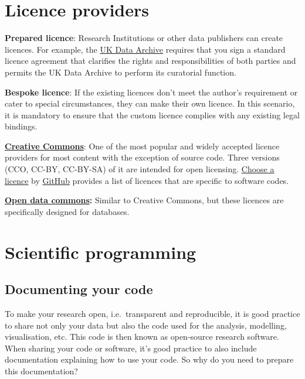 \documentclass[
]{book}
\begin{document}
\hypertarget{licence-providers}{%
\section{Licence providers}\label{licence-providers}}

\textbf{Prepared licence}: Research Institutions or other data publishers can create licences. For example, the \href{https://www.data-archive.ac.uk/d/1QbEbEi0v_mnprVG2sfFdzJ-vYVqv4GijnIadOWkrbFE/edit}{UK Data Archive} requires that you sign a standard licence agreement that clarifies the rights and responsibilities of both parties and permits the UK Data Archive to perform its curatorial function.

\textbf{Bespoke licence}: If the existing licences don't meet the author's requirement or cater to special circumstances, they can make their own licence. In this scenario, it is mandatory to ensure that the custom licence complies with any existing legal bindings.

\href{https://creativecommons.org/}{\textbf{Creative Commons}}: One of the most popular and widely accepted licence providers for most content with the exception of source code. Three versions (CCO, CC-BY, CC-BY-SA) of it are intended for open licensing. \href{https://choosealicense.com/licenses/}{Choose a licence} by \href{https://github.com/}{GitHub} provides a list of licences that are specific to software codes.

\href{https://opendatacommons.org/}{\textbf{Open data commons}}\textbf{:} Similar to Creative Commons, but these licences are specifically designed for databases.

\hypertarget{scientific-programming}{%
\section{Scientific programming}\label{scientific-programming}}

\hypertarget{documenting-your-code}{%
\subsection*{Documenting your code}\label{documenting-your-code}}

To make your research open, i.e.~transparent and reproducible, it is good practice to share not only your data but also the code used for the analysis, modelling, visualisation, etc. This code is then known as open-source research software. When sharing your code or software, it's good practice to also include documentation explaining how to use your code. So why do you need to prepare this documentation?
\end{document}
